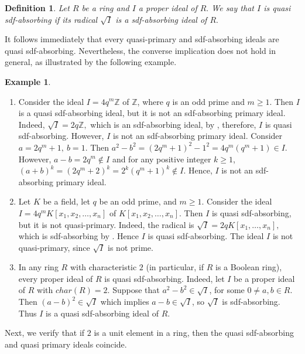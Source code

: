 \documentclass{amsart}%
\newtheorem{definition}{Definition}[section]
\newtheorem{example}{Example}[section]
\begin{document}
\begin{definition}
Let $R$ be a ring and $I$ a proper ideal of $R.$ We say that $I$ is
\emph{quasi sdf-absorbing} if its radical $\sqrt{I}$ is a sdf-absorbing ideal
of $R.$
\end{definition}

It follows immediately that every quasi-primary and sdf-absorbing ideals are
quasi sdf-absorbing. Nevertheless, the converse implication does not hold in
general, as illustrated by the following example.

\begin{example}
\ 
\end{example}

\begin{enumerate}
\item Consider the ideal $I=4q^{m}\mathbb{Z}$ of $\mathbb{Z}$, where $q$ is an
odd prime and $m\geq1$. Then $I$ is a quasi sdf-absorbing ideal, but it is not
an sdf-absorbing primary ideal. Indeed, $\sqrt{I}=2q\mathbb{Z},$ which is an
sdf-absorbing ideal, by \cite[Example 2.8 (a)]{AB2024}, therefore, $I$ is
quasi sdf-absorbing. However, $I$ is not an sdf-absorbing primary ideal.
Consider $a=2q^{m}+1,\ b=1.$ Then $a^{2}-b^{2}=(2q^{m}+1)^{2}-1^{2}%
=4q^{m}(q^{m}+1)\in I.$ However, $a-b=2q^{m}\notin I$ and for any positive
integer $k\geq1$, $(a+b)^{k}=(2q^{m}+2)^{k}=2^{k}(q^{m}+1)^{k}\notin I.$
Hence, $I$ is not an sdf-absorbing primary ideal.

\item Let $K$ be a field, let $q$ be an odd prime, and $m\geq1$. Consider the
ideal $I=4q^{m}K[x_{1},x_{2},\dots,x_{n}]$ of $K[x_{1},x_{2},\dots,x_{n}].$
Then $I$ is quasi sdf-absorbing, but it is not quasi-primary. Indeed, the
radical is $\sqrt{I}=2qK[x_{1},\dots,x_{n}],$ which is sdf-absorbing by
\cite[Corollary 4.3]{AB2024}. Hence $I$ is quasi sdf-absorbing. The ideal $I$
is not quasi-primary, since $\sqrt{I}$ is not prime.

\item In any ring $R$ with characteristic $2$ (in particular, if $R$ is a
Boolean ring), every proper ideal of $R$ is quasi sdf-absorbing. Indeed, let
$I$ be a proper ideal of $R$ with $char(R)=2$. Suppose that $a^{2}-b^{2}%
\in\sqrt{I}$, for some $0\neq a,b\in R.$ Then $(a-b)^{2}\in\sqrt{I}$ which
implies $a-b\in\sqrt{I}$, so $\sqrt{I}$ is sdf-absorbing. Thus $I$ is a quasi
sdf-absorbing ideal of $R.$
\end{enumerate}

Next, we verify that if $2$ is a unit element in a ring, then the quasi
sdf-absorbing and quasi primary ideals coincide.
\end{document}
